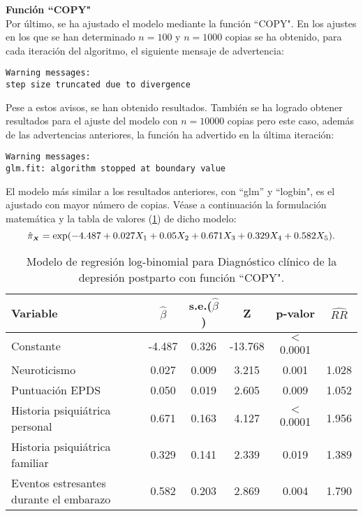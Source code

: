 \textbf{Función ``COPY"}\\
[0.3cm]
Por último, se ha ajustado el modelo mediante la función ``COPY". En los ajustes en los que se han determinado $n=100$ y $n=1000$ copias se ha obtenido, para cada iteración del algoritmo, el siguiente mensaje de advertencia:
\begin{Verbatim}[xleftmargin=2.5cm]
Warning messages:
step size truncated due to divergence
\end{Verbatim}

Pese a estos avisos, se han obtenido resultados. También se ha logrado obtener resultados para el ajuste del modelo con $n=10000$ copias pero este caso, además de las advertencias anteriores, la función ha advertido en la última iteración:
\begin{Verbatim}[xleftmargin=2.5cm]
Warning messages:
glm.fit: algorithm stopped at boundary value
\end{Verbatim}

El modelo más similar a los resultados anteriores, con ``glm'' y ``logbin", es el ajustado con mayor número de copias. Véase a continuación la formulación matemática y la tabla de valores (\ref{tab:17}) de dicho modelo:
\begin{equation*}
\hat{\pi}_{\mathsmaller{\boldsymbol{X}}}=\exp(-4.487+0.027X_1+0.05X_2+0.671X_3+ 0.329X_4+ 0.582X_5).
\end{equation*}

\begin{table} [H]
	\centering
	\begin{tabular}{l c c c c c}
		\toprule
		\textbf{Variable} & $\hat{\beta}$ & s.e.($\hat{\beta}$) & Z & p-valor &$\widehat{RR}$\\
		\midrule
		Constante &  -4.487 &  0.326 &-13.768  & $<$ 0.0001 &  \\
		Neuroticismo & 0.027 &  0.009  & 3.215  &0.001 & 1.028 \\
		Puntuación EPDS & 0.050  & 0.019 &  2.605 & 0.009 &1.052 \\
		Historia psiquiátrica personal & 0.671  & 0.163 &  4.127 &$<$0.0001 & 1.956\\
		Historia psiquiátrica familiar & 0.329  & 0.141 & 2.339 & 0.019 & 1.389\\
		Eventos estresantes durante el embarazo & 0.582 &  0.203  & 2.869 & 0.004 &1.790 \\
		\bottomrule
	\end{tabular}
	\caption{Modelo de regresión log-binomial para Diagnóstico clínico de la depresión postparto con función ``COPY".}
	\label{tab:17}
\end{table}

